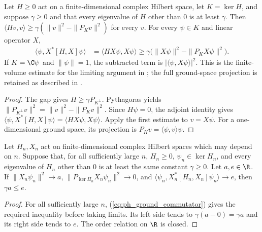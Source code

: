 \begin{lemma}
    \label{thm:ground_projection_commutator_gap}
    \leanok
    Let $H\geq0$ act on a finite-dimensional complex Hilbert space,
    let $K=\ker H$, and suppose $\gamma\geq0$ and that every eigenvalue
    of $H$ other than $0$ is at least $\gamma$.
    Then $\langle Hv,v\rangle\geq
        \gamma(\|v\|^2-\|P_Kv\|^2)$ for every $v$.
    For every $\psi\in K$ and linear operator $X$,
    \begin{align}
        \langle\psi,X^*[H,X]\psi\rangle
         & =\langle HX\psi,X\psi\rangle
        \geq\gamma\bigl(\|X\psi\|^2-\|P_KX\psi\|^2\bigr).
        \label{eq:ph_ground_commutator}
    \end{align}
    If $K=\C\psi$ and $\|\psi\|=1$, the subtracted term is
    $|\langle\psi,X\psi\rangle|^2$.
    This is the finite-volume estimate for the limiting argument in
    \cite[Section~6]{Nachtergaele1996Spectral}; the full ground-space
    projection is retained as described in
    \cite{gap:nachtergaele96_infinite_volume_ground_projection}.
\end{lemma}
\begin{proof}\leanok
    The gap gives $H\geq\gamma P_{K^\perp}$. Pythagoras yields
    $\|P_{K^\perp}v\|^2=\|v\|^2-\|P_Kv\|^2$.
    Since $H\psi=0$, the adjoint identity gives
    $\langle\psi,X^*[H,X]\psi\rangle=\langle HX\psi,X\psi\rangle$.
    Apply the first estimate to $v=X\psi$.
    For a one-dimensional ground space, its projection is
    $P_Kv=\langle\psi,v\rangle\psi$.
\end{proof}

\begin{lemma}
    \label{thm:commutator_gap_projection_limit}
    \leanok
    Let $H_n,X_n$ act on finite-dimensional complex Hilbert spaces which
    may depend on $n$. Suppose that, for all sufficiently large $n$,
    $H_n\geq0$, $\psi_n\in\ker H_n$, and every eigenvalue of $H_n$
    other than $0$ is at least the same constant $\gamma\geq0$.
    Let $a,e\in\R$. If $\|X_n\psi_n\|^2\to a$,
    $\|P_{\ker H_n}X_n\psi_n\|^2\to0$, and
    $\langle\psi_n,X_n^*[H_n,X_n]\psi_n\rangle\to e$, then
    $\gamma a\leq e$.
\end{lemma}
\begin{proof}\leanok
    For all sufficiently large $n$, (\ref{eq:ph_ground_commutator})
    gives the required inequality before taking limits.
    Its left side tends to $\gamma(a-0)=\gamma a$ and its right side
    tends to $e$. The order relation on $\R$ is closed.
\end{proof}

